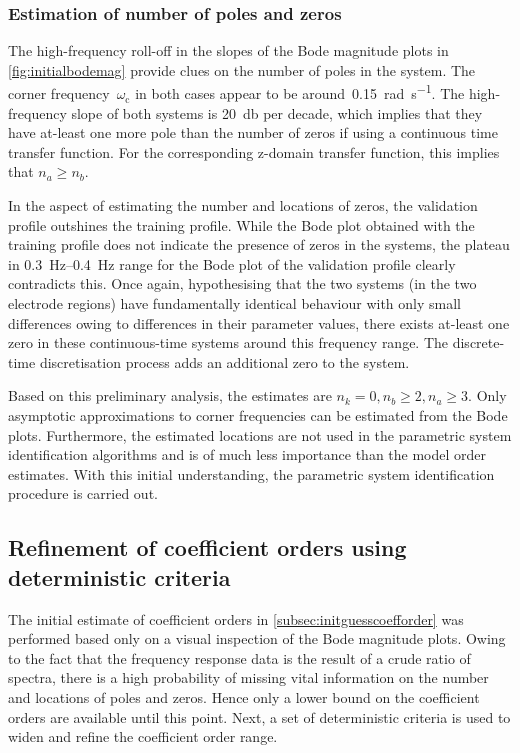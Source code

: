 \subsubsection*{Estimation of number of poles and zeros}

The  high-frequency  roll-off  in  the   slopes  of  the  Bode  magnitude  plots
in  \cref{fig:initialbodemag}  provide clues  on  the  number  of poles  in  the
system.  The  corner frequency~$\omega_\text{c}$  in  both  cases appear  to  be
around~\SI{0.15}{\radian\per\second}. The  high-frequency slope of  both systems
is \approx\SI{20}{\decibel}  per decade, which  implies that they  have at-least
one more  pole than  the number  of zeros  if using  a continuous  time transfer
function. For  the corresponding z-domain  transfer function, this  implies that
$n_a \ge n_b$.

In the  aspect of estimating the  number and locations of  zeros, the validation
profile outshines  the training profile. While  the Bode plot obtained  with the
training profile  does not indicate  the presence of  zeros in the  systems, the
plateau in \SIrange{0.3}{0.4}{\hertz} range for  the Bode plot of the validation
profile clearly contradicts this. Once again, hypothesising that the two systems
(in the two electrode regions)  have fundamentally identical behaviour with only
small differences owing  to differences in their parameter  values, there exists
at-least one zero in these  continuous-time systems around this frequency range.
The discrete-time discretisation process adds an additional zero to the system.

Based on this preliminary  analysis, the estimates are $n_k = 0,  n_b \ge 2, n_a
\ge 3$.  Only asymptotic approximations  to corner frequencies can  be estimated
from the  Bode plots. Furthermore, the  estimated locations are not  used in the
parametric system identification algorithms and  is of much less importance than
the  model order  estimates.  With this  initial  understanding, the  parametric
system identification procedure is carried out.

\subsection{Refinement of coefficient orders using deterministic criteria}\label{subsec:refinementofcoefforder}

The initial estimate  of coefficient orders in \cref{subsec:initguesscoefforder}
was performed  based only on  a visual inspection  of the Bode  magnitude plots.
Owing to  the fact that  the frequency  response data is  the result of  a crude
ratio of  spectra, there is a  high probability of missing  vital information on
the number and locations of poles and zeros. Hence only a lower bound on the
coefficient orders are available until this point. Next, a set of deterministic
criteria is used to widen and refine the coefficient order range.

